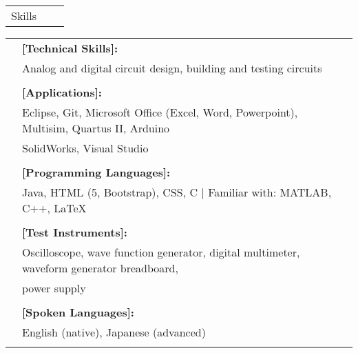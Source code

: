 \documentclass[letterpaper,10pt,oneside]{article}
\begin{document}
 \noindent \begin{tabularx}{\linewidth}{@{} l l R } 
     \Large{Skills}\\
 \end{tabularx}
 \noindent \begin{tabularx}{\linewidth}{@{} l l l }
 	 &\textbf{[Technical Skills]:}\\
 	 &Analog and digital circuit design, building and testing circuits\\
 	 \\     
     &\textbf{[Applications]:}\\
     &Eclipse, Git, Microsoft Office (Excel, Word, Powerpoint), Multisim, Quartus II, Arduino\\
     &SolidWorks, Visual Studio\\
     \\
     &\textbf{[Programming Languages]:}\\
     &Java, HTML (5, Bootstrap), CSS, C $\mid$ Familiar with: MATLAB, C++, \LaTeX  \\
     \\
     &\textbf{[Test Instruments]:}\\
     &Oscilloscope, wave function generator, digital multimeter, waveform generator breadboard,\\
     &power supply\\
     \\
     &\textbf{[Spoken Languages]:}\\
     &English (native), Japanese (advanced) \\
     \\
 \end{tabularx}
 
\end{document}
